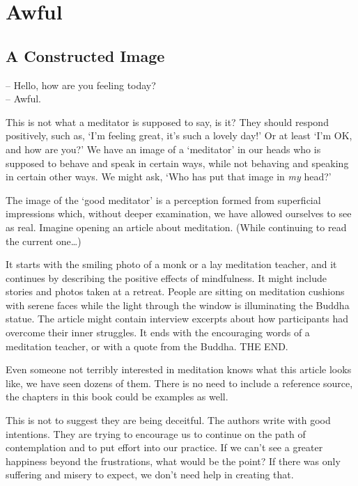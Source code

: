 \chapter{Awful}

\section{A Constructed Image}


\noindent -- Hello, how are you feeling today?\\
-- Awful.

This is not what a meditator is supposed to say, is it? They should
respond positively, such as, `I'm feeling great, it's such a lovely
day!' Or at least `I'm OK, and how are you?' We have an image of a
`meditator' in our heads who is supposed to behave and speak in certain
ways, while not behaving and speaking in certain other ways. We might
ask, `Who has put that image in \emph{my} head?'

The image of the `good meditator' is a perception formed from
superficial impressions which, without deeper examination, we have
allowed ourselves to see as real. Imagine opening an article about
meditation. (While continuing to read the current one\ldots)

It starts with the smiling photo of a monk or a lay meditation teacher,
and it continues by describing the positive effects of mindfulness. It
might include stories and photos taken at a retreat. People are sitting
on meditation cushions with serene faces while the light through the
window is illuminating the Buddha statue. The article might contain
interview excerpts about how participants had overcome their inner
struggles. It ends with the encouraging words of a meditation teacher,
or with a quote from the Buddha. THE END.

Even someone not terribly interested in meditation knows what this
article looks like, we have seen dozens of them. There is no need to
include a reference source, the chapters in this book could be examples
as well.

This is not to suggest they are being deceitful. The authors write with
good intentions. They are trying to encourage us to continue on the path
of contemplation and to put effort into our practice. If we can't see a
greater happiness beyond the frustrations, what would be the point? If
there was only suffering and misery to expect, we don't need help in
creating that.

